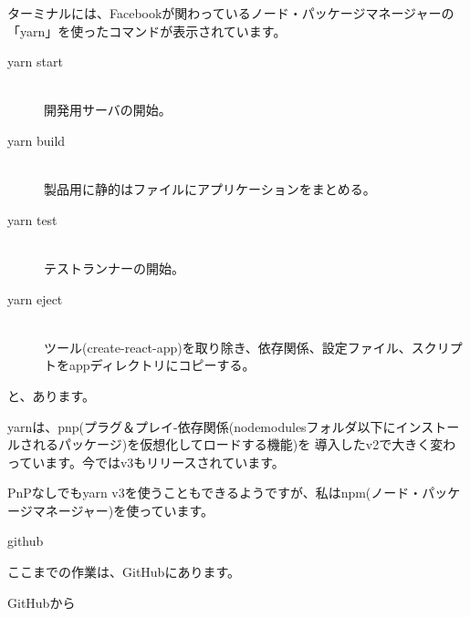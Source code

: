 \def\startercodeblockfontsize{}
\begin{starterterminal}[]{}\end{starterterminal}
\begin{starterquote}

ターミナルには、Facebookが関わっているノード・パッケージマネージャーの「yarn」を使ったコマンドが表示されています。

\begin{description}
\item[yarn start] \mbox{} \\
開発用サーバの開始。
\item[yarn build] \mbox{} \\
製品用に静的はファイルにアプリケーションをまとめる。
\item[yarn test] \mbox{} \\
テストランナーの開始。
\item[yarn eject] \mbox{} \\
ツール(create{-}react{-}app)を取り除き、依存関係、設定ファイル、スクリプトをappディレクトリにコピーする。
\end{description}

と、あります。

\vspace*{\baselineskip}

yarnは、pnp(プラグ＆プレイ{-}依存関係(node\textunderscore{}modulesフォルダ以下にインストールされるパッケージ)を仮想化してロードする機能)を
導入したv2で大きく変わっています。今ではv3もリリースされています。

\vspace*{\baselineskip}

PnPなしでもyarn v3を使うこともできるようですが、私はnpm(ノード・パッケージマネージャー)を使っています。

\end{starterquote}
\begin{starternote}[]{github}

ここまでの作業は、GitHubにあります。

\def\startercodeblockfontsize{}
\begin{starterterminal}[]{GitHubから}\end{starterterminal}
\end{starternote}

